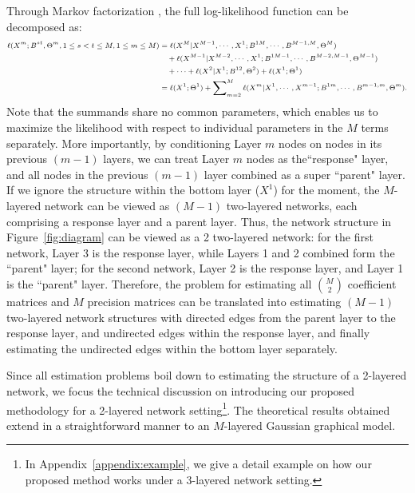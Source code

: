 \medskip
Through Markov factorization \citep{lauritzen1996graphical}, the full log-likelihood function can be decomposed as:
\begin{equation*}
\scriptsize
\begin{split}
\ell(X^m; B^{st},\Theta^m,1\leq s<t\leq M,1\leq m\leq M)& =\ell(X^M|X^{M-1},\cdots,X^1;B^{1M},\cdots,B^{M-1,M},\Theta^M) \\ 
&\quad  + \ell(X^{M-1}|X^{M-2},\cdots,X^1;B^{1M-1},\cdots,B^{M-2,M-1},\Theta^{M-1})\\
& \quad + \cdots + \ell(X^2|X^1; B^{12},\Theta^2)+ \ell(X^1; \Theta^1)\\
& = \ell(X^1; \Theta^1) + \sum\nolimits_{m=2}^M \ell(X^m|X^1,\cdots,X^{m-1}; B^{1m},\cdots,B^{m-1,m},\Theta^m). 
\end{split}
\end{equation*}
Note that the summands share no common parameters, which enables us to maximize the likelihood with respect to individual parameters in the $M$ terms separately. More importantly, by conditioning Layer $m$ nodes on nodes in its previous $(m-1)$ layers, we can treat Layer $m$ nodes as the``response" layer, and all nodes in the previous $(m-1)$ layer combined as a super ``parent" layer. If we ignore the structure within the bottom layer ($X^1$) for the moment, the $M$-layered network can be viewed as $(M-1)$ two-layered networks, each comprising a response layer and a parent layer. Thus, the network structure in Figure~\ref{fig:diagram} can be viewed as a 2 two-layered network: for the first network, Layer 3 is the response layer, while Layers 1 and 2 combined form the ``parent" layer; for the second network, Layer 2 is the response layer, and Layer 1 is the ``parent" layer. Therefore, the problem for estimating all $\binom{M}{2}$ coefficient matrices and $M$ precision matrices can be translated into estimating $(M-1)$ two-layered network structures with directed edges from the parent layer to the response layer, and undirected edges within the response layer, and finally estimating the undirected edges within the bottom layer separately. 

Since all estimation problems boil down to estimating the structure of a 2-layered network, we focus the technical discussion on introducing our proposed methodology for a 2-layered network setting\footnote{In Appendix~\ref{appendix:example}, we give a detail example on how our proposed method works under a 3-layered network setting.}. The theoretical results obtained extend in a straightforward manner to an $M$-layered Gaussian graphical model.


